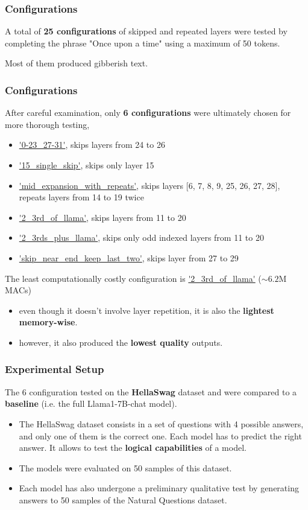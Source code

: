 \documentclass{beamer}
\begin{document}
\begin{frame}
  \frametitle{Configurations}
  A total of \textbf{25 configurations} of skipped and repeated layers were tested by completing the phrase "Once upon a time" using a maximum of 50 tokens.

  Most of them produced gibberish text.
\end{frame}

\begin{frame}
  \frametitle{Configurations}
  After careful examination, only \textbf{6 configurations} were ultimately chosen for more thorough testing,
  \begin{itemize}
    \item \url{'0-23\_27-31'}, skips layers from 24 to 26
    \item \url{'15\_single\_skip'}, skips only layer 15
    \item \url{'mid\_expansion\_with\_repeats'}, skips layers [6, 7, 8, 9, 25, 26, 27, 28], repeats layers from 14 to 19 twice
    \item \url{'2\_3rd\_of\_llama'}, skips layers from 11 to 20
    \item \url{'2\_3rds\_plus\_llama'}, skips only odd indexed layers from 11 to 20
    \item \url{'skip\_near\_end\_keep\_last\_two'}, skips layer from 27 to 29
  \end{itemize}
  The least computationally costly configuration is \url{'2\_3rd\_of\_llama'} ($\sim 6.2$M MACs)
  \begin{itemize}
    \item even though it doesn't involve layer repetition, it is also the \textbf{lightest memory-wise}.
    \item however, it also produced the \textbf{lowest quality} outputs.
  \end{itemize}
  \end{frame}

\begin{frame}
  \frametitle{Experimental Setup}
  The 6 configuration tested on the \textbf{HellaSwag} dataset and were compared
  to a \textbf{baseline} (i.e. the full Llama1-7B-chat model).
  \begin{itemize}
    \item The HellaSwag dataset consists in a set of questions with 4 possible answers, and only one of them is the correct one. Each model has to predict the right answer. It allows to test the \textbf{logical capabilities} of a model.
    \item The models were evaluated on 50 samples of this dataset.
    \item Each model has also undergone a preliminary qualitative test by generating answers to 50 samples of the Natural Questions dataset.
  \end{itemize}
\end{frame}
\end{document}
